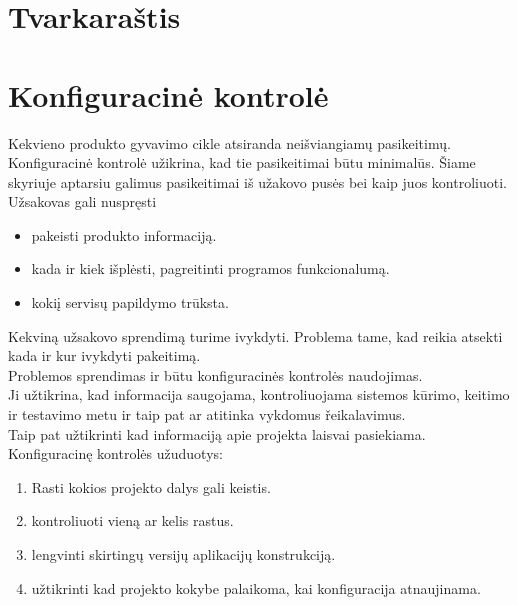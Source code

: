 \documentclass[a4paper,12pt]{article}
\begin{document}
\section{ Tvarkaraštis}


 


\section{Konfiguracin\. e kontrol\. e}
Kekvieno produkto gyvavimo cikle atsiranda nei\v sviangiam\k u pasikeitim\k u.\\
Konfiguracin\. e kontrol\. e u\v zikrina, kad tie pasikeitimai b\= utu minimal\= us.
\v Siame skyriuje aptarsiu galimus pasikeitimai i\v s u\v zakovo pus\. es bei kaip juos kontroliuoti. \\
U\v zsakovas gali nuspr\k esti
\begin{itemize}
	\item pakeisti produkto informacij\k a.
	\item kada ir kiek i\v spl\. esti, pagreitinti programos funkcionalum\k a.
	\item koki\k i servis\k u papildymo tr\= uksta.
\end{itemize}

Kekvin\k a u\v zsakovo sprendim\k a turime ivykdyti. Problema tame, kad reikia atsekti kada ir kur ivykdyti pakeitim\k a.\\
Problemos sprendimas ir b\= utu konfiguracin\. es kontrol\. es naudojimas.\\
Ji u\v ztikrina, kad informacija saugojama, kontroliuojama sistemos k\= urimo, keitimo ir testavimo metu ir taip pat ar atitinka vykdomus \v reikalavimus. \\
Taip pat u\v ztikrinti kad informacij\k a apie projekta laisvai pasiekiama.\\

Konfiguracin\k e kontrol\. es u\v zuduotys:
\begin{enumerate}
	\item Rasti kokios projekto dalys gali keistis.
	\item kontroliuoti vien\k a ar kelis rastus.
	\item lengvinti skirting\k u versij\k u aplikacij\k u konstrukcij\k a. 
	\item u\v ztikrinti kad projekto kokybe palaikoma, kai konfiguracija atnaujinama.
\end{enumerate}
\end{document}
